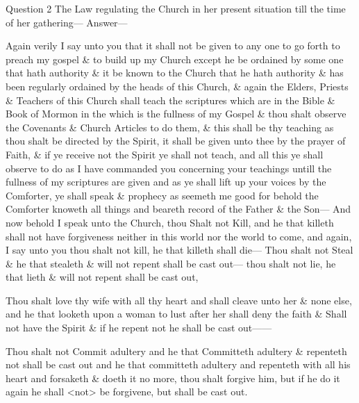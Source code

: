 			Question 2 The Law regulating the Church in her present situation till the time of her gathering--- Answer---

			Again verily I say unto you that it shall not be given to any one to go forth to preach my gospel \& to build up my Church except he be ordained by some one that hath authority \& it be known to the Church that he hath authority \& has been regularly ordained by the heads of this Church, \& again the Elders, Priests \& Teachers of this Church shall teach the scriptures which are in the Bible \& Book of Mormon in the which is the fullness of my Gospel \& thou shalt observe the Covenants \& Church Articles to do them, \& this shall be thy teaching as thou shalt be directed by the Spirit, it shall be given unto thee by the prayer of Faith, \& if ye receive not the Spirit ye shall not teach, and all this ye shall observe to do as I have commanded you concerning your teachings untill the fullness of my scriptures are given and as ye shall lift up your voices by the Comforter, ye shall speak \& prophecy as seemeth me good for behold the Comforter knoweth all things and beareth record of the Father \& the Son--- And now behold I speak unto the Church, thou Shalt not Kill, and he that killeth shall not have forgiveness neither in this world nor the world to come, and again, I say unto you thou shalt not kill, he that killeth shall die--- Thou shalt not Steal \& he that stealeth \& will not repent shall be cast out--- thou shalt not lie, he that lieth \& will not repent shall be cast out,

			Thou shalt love thy wife with all thy heart and shall cleave unto her \& none else, and he that looketh upon a woman to lust after her shall deny the faith \& Shall not have the Spirit \& if he repent not he shall be cast out------

			Thou shalt not Commit adultery and he that Committeth adultery \& repenteth not shall be cast out and he that committeth adultery and repenteth with all his heart and forsaketh \& doeth it no more, thou shalt forgive him, but if he do it again he shall <not> be forgivene, but shall be cast out.

